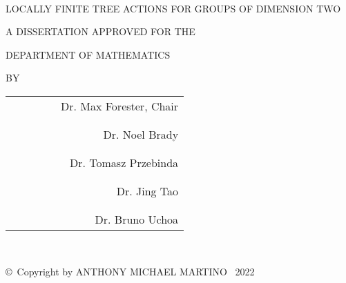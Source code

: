 \documentclass[12pt,parskip=full]{report}
\theoremstyle{plain}
\theoremstyle{definition}
\begin{document}
{{%
\newpage
\thispagestyle{empty}
\ \vspace{0.25in}
\begin{center}
{%
\uppercase{locally finite tree actions for groups of dimension two}
\par
\vspace{0.17in}

\par
\vspace{0.5in}

\uppercase{A dissertation approved for the}
\par
\uppercase{Department of Mathematics}
\par
\vspace{1in}
\uppercase{by}
\par
\vspace{2in}
\begin{flushright}
\begin{tabular}{cr}
\  \  \  \  \  \  \  & Dr. Max Forester, Chair\\
  \\ &  \\
  & Dr. Noel Brady \\
 \\ &  \\
 & Dr. Tomasz Przebinda \\
 \\ &  \\
 & Dr. Jing Tao \\
  \\ &  \\
   & Dr. Bruno Uchoa \\
\end{tabular}
\end{flushright}
} 
\end{center}


\newpage
\thispagestyle{empty}
\   \
\par
\vfill
\begin{center}
\copyright \    Copyright by \uppercase{Anthony Michael Martino} \   2022


\end{center}}}
\end{document}
